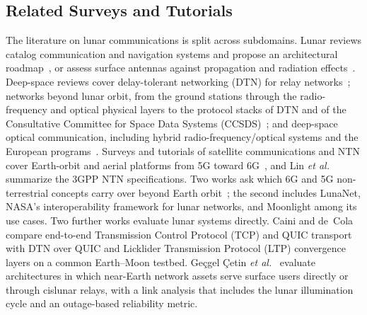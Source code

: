 \documentclass{IEEEoj}
\begin{document}
\subsection{Related Surveys and Tutorials}
The literature on lunar communications is split across subdomains. Lunar reviews catalog communication and navigation systems and propose an architectural roadmap~\cite{marine_roig_survey}, or assess surface antennas against propagation and radiation effects~\cite{alqodah_review}. Deep-space reviews cover delay-tolerant networking (DTN) for relay networks~\cite{islam_dtn_survey}; networks beyond lunar orbit, from the ground stations through the radio-frequency and optical physical layers to the protocol stacks of DTN and of the Consultative Committee for Space Data Systems (CCSDS)~\cite{alshehhi_ojcoms2026}; and deep-space optical communication, including hybrid radio-frequency/optical systems and the European programs~\cite{karmous_comst2025,ivanov_ijscn2025}. Surveys and tutorials of satellite communications and NTN cover Earth-orbit and aerial platforms from 5G toward 6G~\cite{kodheli2021satcom,giordani2021ntn,azari2022ntn,jamshed_ntn_tutorial,nguyen_ntn_ojcoms2024}, and Lin \emph{et al.}~\cite{lin2021ntn} summarize the 3GPP NTN specifications. Two works ask which 6G and 5G non-terrestrial concepts carry over beyond Earth orbit~\cite{liyanaarachchi_cislunar,ntontin_procieee2025}; the second includes LunaNet, NASA's interoperability framework for lunar networks, and Moonlight among its use cases. Two further works evaluate lunar systems directly. Caini and de~Cola~\cite{e2e_vs_dtn_2026} compare end-to-end Transmission Control Protocol (TCP) and QUIC transport with DTN over QUIC and Licklider Transmission Protocol (LTP) convergence layers on a common Earth--Moon testbed. Ge\c{c}gel \c{C}etin \emph{et al.}~\cite{cetin_taes2026} evaluate architectures in which near-Earth network assets serve surface users directly or through cislunar relays, with a link analysis that includes the lunar illumination cycle and an outage-based reliability metric.
\end{document}
